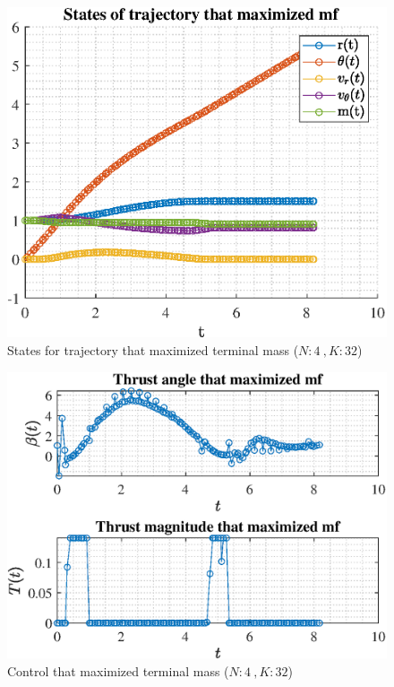 \documentclass[]{article}
\begin{document}
	\begin{figure}
		\centering
		\includegraphics[scale=0.75]{states_N4_K32_C3_mf.eps}
		\caption{States for trajectory that maximized terminal mass (\(N:4\ , K:32\))}
		\label{fig:states_N4_K32_C3_mf}
	\end{figure}
	\begin{figure}
		\centering
		\includegraphics[scale=0.75]{control_N4_K32_C3_mf.eps}
		\caption{Control that maximized terminal mass (\(N:4\ , K:32\))}
		\label{fig:control_N4_K32_C3_mf}
	\end{figure}
\end{document}
